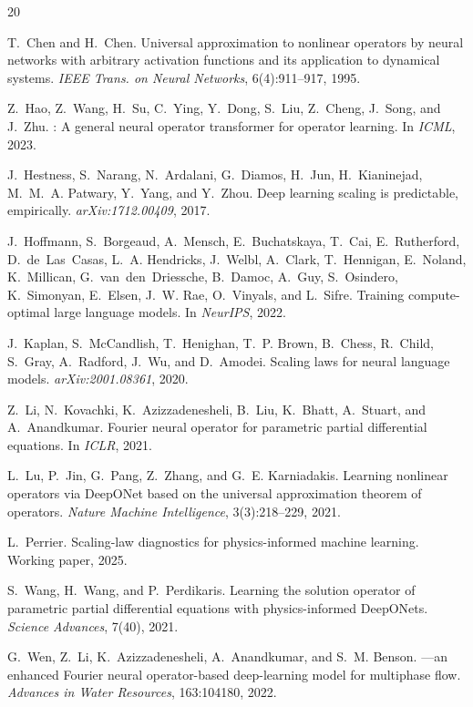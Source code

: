 \documentclass[11pt]{article}
\begin{document}
\begin{thebibliography}{20}

T.~Chen and H.~Chen.
\newblock Universal approximation to nonlinear operators by neural networks
  with arbitrary activation functions and its application to dynamical systems.
\newblock \emph{IEEE Trans. on Neural Networks}, 6(4):911--917, 1995.

Z.~Hao, Z.~Wang, H.~Su, C.~Ying, Y.~Dong, S.~Liu, Z.~Cheng, J.~Song, and
  J.~Zhu.
: A general neural operator transformer for operator learning.
\newblock In \emph{ICML}, 2023.

J.~Hestness, S.~Narang, N.~Ardalani, G.~Diamos, H.~Jun, H.~Kianinejad,
  M.~M.~A. Patwary, Y.~Yang, and Y.~Zhou.
\newblock Deep learning scaling is predictable, empirically.
\newblock \emph{arXiv:1712.00409}, 2017.

J.~Hoffmann, S.~Borgeaud, A.~Mensch, E.~Buchatskaya, T.~Cai, E.~Rutherford,
  D.~de~Las~Casas, L.~A. Hendricks, J.~Welbl, A.~Clark, T.~Hennigan,
  E.~Noland, K.~Millican, G.~van~den~Driessche, B.~Damoc, A.~Guy,
  S.~Osindero, K.~Simonyan, E.~Elsen, J.~W. Rae, O.~Vinyals, and
  L.~Sifre.
\newblock Training compute-optimal large language models.
\newblock In \emph{NeurIPS}, 2022.

J.~Kaplan, S.~McCandlish, T.~Henighan, T.~P. Brown, B.~Chess, R.~Child,
  S.~Gray, A.~Radford, J.~Wu, and D.~Amodei.
\newblock Scaling laws for neural language models.
\newblock \emph{arXiv:2001.08361}, 2020.

Z.~Li, N.~Kovachki, K.~Azizzadenesheli, B.~Liu, K.~Bhatt, A.~Stuart, and
  A.~Anandkumar.
\newblock Fourier neural operator for parametric partial differential equations.
\newblock In \emph{ICLR}, 2021.

L.~Lu, P.~Jin, G.~Pang, Z.~Zhang, and G.~E. Karniadakis.
\newblock Learning nonlinear operators via {DeepONet} based on the universal
  approximation theorem of operators.
\newblock \emph{Nature Machine Intelligence}, 3(3):218--229, 2021.

L.~Perrier.
\newblock Scaling-law diagnostics for physics-informed machine learning.
\newblock Working paper, 2025.

S.~Wang, H.~Wang, and P.~Perdikaris.
\newblock Learning the solution operator of parametric partial differential
  equations with physics-informed {DeepONets}.
\newblock \emph{Science Advances}, 7(40), 2021.

G.~Wen, Z.~Li, K.~Azizzadenesheli, A.~Anandkumar, and S.~M. Benson.
---an enhanced {Fourier} neural operator-based deep-learning
  model for multiphase flow.
\newblock \emph{Advances in Water Resources}, 163:104180, 2022.

\end{thebibliography}
\end{document}
